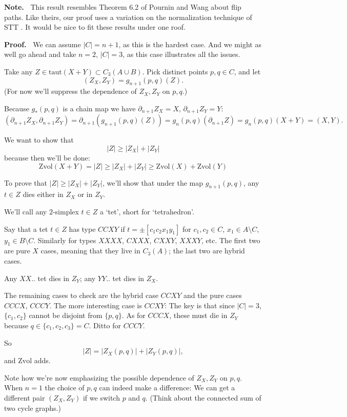 \documentclass[12pt]{article}
\newcommand{\proofstart}{{\noindent \bf Proof.\ }}
\newcommand{\note}{{\noindent \bf Note.\ }}
\def\del{\partial}
\newcommand{\union}{\cup}
\newcommand{\kw}{\mathrm}
\newcommand{\taut}{\kw{taut}}
\newcommand{\Zvol}{\kw{Zvol}}
\begin{document}
\note
This result resembles Theorem 6.2 of
Pournin and Wang
\cite{pw:flip}
about flip paths.
Like theirs, our proof uses a variation on the normalization technique
of STT
\cite[Lemma 7]{stt:jams}.
It would be nice to fit these results under one roof.
\medskip

\proofstart
We can assume $|C| = n+1$,
as this is the hardest case.
And we might as well go ahead and take $n=2$, $|C|=3$,
as this case illustrates all the issues.

Take any $Z \in \taut(X+Y) \subset C_3(A \union B)$.
Pick distinct points $p,q \in C$,
and let
\[
(Z_X,Z_Y) = g_{n+1}(p,q)(Z)
.
\]
(For now we'll suppress the dependence of $Z_X,Z_Y$ on $p,q$.)

Because $g_*(p,q)$ is a chain map we have
$\del_{n+1} Z_X = X$, $\del_{n+1} Z_Y = Y$:
\[
(\del_{n+1} Z_X, \del_{n+1} Z_Y)
=
\del_{n+1} (g_{n+1}(p,q)(Z))
=
g_n(p, q)(\del_{n+1} Z)
=
g_n(p,q)(X+Y)
=
(X,Y)
.
\]

We want to show that
\[
|Z| \geq |Z_X| + |Z_Y|
\]
because then we'll be done:
\[
\Zvol(X+Y) = |Z| \geq |Z_X| + |Z_Y| \geq \Zvol(X) + \Zvol(Y)
\]

To prove that
$|Z| \geq |Z_X| + |Z_Y|$,
we'll show that under the map $g_{n+1}(p,q)$,
any $t \in Z$ dies either in $Z_X$ or in $Z_Y$.

We'll call any $2$-simplex $t \in Z$ a `tet', short for `tetrahedron'.

Say that a tet $t \in Z$ has type $CCXY$ if $t= \pm[c_1c_2x_1y_1]$
for $c_1,c_2 \in C$, $x_1 \in A \setminus C$, $y_1 \in B \setminus C$.
Similarly for types $XXXX$, $CXXX$, $CXXY$, $XXXY$, etc.
The first two are pure $X$ cases, meaning that they live in $C_3(A)$;
the last two are hybrid cases.

Any $XX..$ tet dies in $Z_Y$;
any $YY..$ tet dies in $Z_X$.

The remaining cases to check are
the hybrid case $CCXY$
and the pure cases $CCCX$, $CCCY$.
The more interesting case is $CCXY$:
The key is that since $|C|=3$, $\{c_1,c_2\}$ cannot be disjoint from $\{p,q\}$.
As for $CCCX$, these must die in $Z_Y$
because $q \in \{c_1,c_2,c_3\} = C$.
Ditto for $CCCY$.

So 
\[
|Z| = |Z_X(p,q)| + |Z_Y(p,q)|,
\]
and $\Zvol$ adds.

Note how we're now emphasizing the possible dependence of $Z_X,Z_Y$ on $p,q$.
When $n=1$ the choice of $p,q$ can indeed make a difference:
We can get a different pair $(Z_X,Z_Y)$ if we switch
$p$ and $q$.
(Think about the connected sum of two cycle graphs.)
\end{document}
